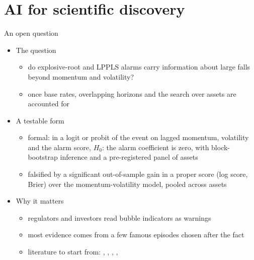 \section{AI for scientific discovery}

\begin{frame}{An open question}
\itemsize{\small}
\begin{itemize}
    \item The question
    \begin{itemize}
        \item do explosive-root and LPPLS alarms carry information about large falls beyond momentum and volatility?
        \item once base rates, overlapping horizons and the search over assets are accounted for
    \end{itemize}
    \item A testable form
    \begin{itemize}
        \item formal: in a logit or probit of the event on lagged momentum, volatility and the alarm score, $H_0$: the alarm coefficient is zero, with block-bootstrap inference and a pre-registered panel of assets
        \item falsified by a significant out-of-sample gain in a proper score (log score, Brier) over the momentum-volatility model, pooled across assets
    \end{itemize}
    \item Why it matters
    \begin{itemize}
        \item regulators and investors read bubble indicators as warnings
        \item most evidence comes from a few famous episodes chosen after the fact
        \item literature to start from: , , , , 
    \end{itemize}
\end{itemize}
\end{frame}

